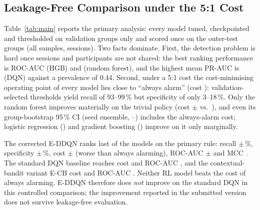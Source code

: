 \subsection{Leakage-Free Comparison under the 5:1 Cost}
\label{sec:main}
Table~\ref{tab:main} reports the primary analysis: every model tuned, checkpointed and thresholded on validation groups only and scored once on the outer-test groups (all \nSamplesEval{} samples, \nSessionsEval{} sessions). Two facts dominate. First, the detection problem is hard once sessions and participants are not shared: the best ranking performance is ROC-AUC \HGBCostRocAucMean{} (HGB) and \RFCostRocAucMean{} (random forest), and the highest mean PR-AUC is \DQNCostPrAucMean{} (DQN) against a prevalence of 0.44. Second, under a 5:1 cost the cost-minimising operating point of every model lies close to ``always alarm'' (cost \AlwaysCost): validation-selected thresholds yield recall of 93--99\,\% but specificity of only 3--18\,\%. Only the random forest improves materially on the trivial policy (cost \RFCostCostMean$\pm$\RFCostCostSD{} vs.\ \AlwaysCost), and even its group-bootstrap 95\,\% CI (seed ensemble, \RFCICostLo--\RFCICostHi) includes the always-alarm cost; logistic regression (\LRCostCostMean) and gradient boosting (\HGBCostCostMean) improve on it only marginally.

The corrected E-DDQN ranks last of the \nModels{} models on the primary rule: recall \EDDQNCostRecallMean$\pm$\EDDQNCostRecallSD\,\%, specificity \EDDQNCostSpecMean$\pm$\EDDQNCostSpecSD\,\%, cost \EDDQNCostCostMean$\pm$\EDDQNCostCostSD{} (worse than always alarming), ROC-AUC \EDDQNCostRocAucMean$\pm$\EDDQNCostRocAucSD{} and MCC \EDDQNCostMCCMean. The standard DQN baseline reaches cost \DQNCostCostMean{} and ROC-AUC \DQNCostRocAucMean, and the contextual-bandit variant E-CB cost \ECBCostCostMean{} and ROC-AUC \ECBCostRocAucMean. Neither RL model beats the cost of always alarming. E-DDQN therefore does \emph{not} improve on the standard DQN in this controlled comparison; the improvement reported in the submitted version does not survive leakage-free evaluation.

\begin{table}[t]
\centering
\caption{Primary analysis (rule D1: threshold minimising the 5:1 cost on pooled inner-validation predictions). Mean~$\pm$~SD over five seeds of the pooled outer-test metrics (\nSamplesEval{} samples; recall, specificity, precision, F1 and balanced accuracy in \%); FN and FP are exact counts of the seed ensemble. Bold: lowest cost. HGB and logistic regression are deterministic given the data, hence SD = 0.}
\label{tab:main}
\resizebox{\textwidth}{!}{}
\end{table}

